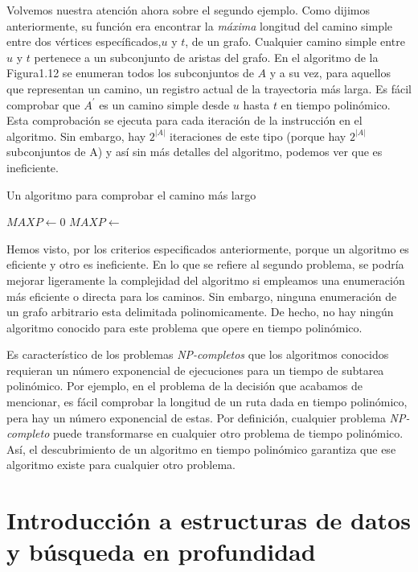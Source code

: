 \documentclass[10pt,a5paper]{book}
\begin{document}
Volvemos nuestra atención ahora sobre el segundo ejemplo. Como dijimos anteriormente, su función era encontrar la \emph{máxima} longitud del camino simple entre dos vértices específicados,$u$ y $t$, de un grafo. Cualquier camino simple entre $u$ y $t$ pertenece a un subconjunto de aristas del grafo. En el algoritmo de la Figura1.12 se enumeran todos los subconjuntos de $A$ y a su vez, para aquellos que representan un camino, un registro actual de la trayectoria más larga. Es fácil comprobar que $A^{'}$ es un camino simple desde $u$ hasta $t$ en tiempo polinómico. Esta comprobación se ejecuta para cada iteración de la instrucción en el algoritmo. Sin embargo, hay $2^{|A|}$ iteraciones de este tipo (porque hay $2^{|A|}$ subconjuntos de A) y así sin más detalles del algoritmo, podemos ver que es ineficiente.
\vfill
\begin{algorithm}[H]
\caption{Un algoritmo para comprobar el camino más largo}
\BlankLine
\dontprintsemicolon
$MAXP \leftarrow 0$\;
  {
  {$MAXP \leftarrow$ }}
\end{algorithm}

Hemos visto, por los criterios especificados anteriormente, porque un algoritmo es eficiente y otro es ineficiente. En lo que se refiere al segundo problema, se podría mejorar ligeramente la complejidad del algoritmo si empleamos una enumeración más eficiente o directa para los caminos. Sin embargo, ninguna enumeración de un grafo arbitrario esta delimitada polinomicamente. De hecho, no hay ningún algoritmo conocido para este problema que opere en tiempo polinómico.

Es característico de los problemas \emph{NP-completos} que los algoritmos conocidos requieran un número exponencial de ejecuciones para un tiempo de subtarea polinómico. Por ejemplo, en el problema de la decisión que acabamos de mencionar, es fácil comprobar la longitud de un ruta dada en tiempo polinómico, pera hay un número exponencial de estas. Por definición, cualquier problema \emph{NP-completo} puede transformarse en cualquier otro problema de tiempo polinómico. Así, el descubrimiento de un algoritmo en tiempo polinómico garantiza que ese algoritmo existe para cualquier otro problema.

\section[Estructuras de datos y Búsqueda en Prof.]{Introducción a estructuras de datos y búsqueda en profundidad}
\end{document}
